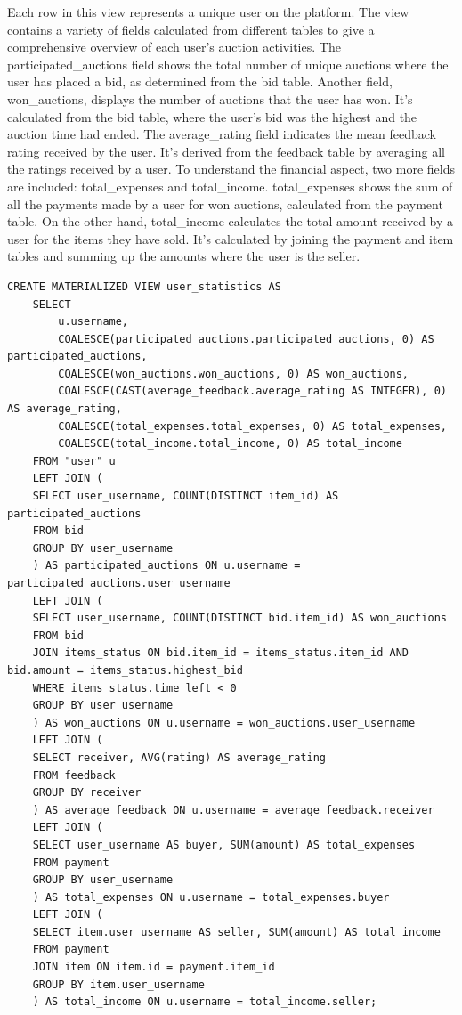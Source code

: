 Each row in this view represents a unique user on the platform. The view contains a variety of fields calculated from different tables to give a comprehensive overview of each user's auction activities. The participated\_auctions field shows the total number of unique auctions where the user has placed a bid, as determined from the bid table. Another field, won\_auctions, displays the number of auctions that the user has won. It's calculated from the bid table, where the user's bid was the highest and the auction time had ended. The average\_rating field indicates the mean feedback rating received by the user. It's derived from the feedback table by averaging all the ratings received by a user.
To understand the financial aspect, two more fields are included: total\_expenses and total\_income. total\_expenses shows the sum of all the payments made by a user for won auctions, calculated from the payment table. On the other hand, total\_income calculates the total amount received by a user for the items they have sold. It's calculated by joining the payment and item tables and summing up the amounts where the user is the seller.

\begin{lstlisting}[style=sqlStyle]
	CREATE MATERIALIZED VIEW user_statistics AS
	SELECT 
		u.username,
		COALESCE(participated_auctions.participated_auctions, 0) AS participated_auctions,
		COALESCE(won_auctions.won_auctions, 0) AS won_auctions,
		COALESCE(CAST(average_feedback.average_rating AS INTEGER), 0) AS average_rating,
		COALESCE(total_expenses.total_expenses, 0) AS total_expenses,
		COALESCE(total_income.total_income, 0) AS total_income
	FROM "user" u
	LEFT JOIN (
	SELECT user_username, COUNT(DISTINCT item_id) AS participated_auctions
	FROM bid
	GROUP BY user_username
	) AS participated_auctions ON u.username = participated_auctions.user_username
	LEFT JOIN (
	SELECT user_username, COUNT(DISTINCT bid.item_id) AS won_auctions
	FROM bid
	JOIN items_status ON bid.item_id = items_status.item_id AND bid.amount = items_status.highest_bid
	WHERE items_status.time_left < 0
	GROUP BY user_username
	) AS won_auctions ON u.username = won_auctions.user_username
	LEFT JOIN (
	SELECT receiver, AVG(rating) AS average_rating
	FROM feedback
	GROUP BY receiver
	) AS average_feedback ON u.username = average_feedback.receiver
	LEFT JOIN (
	SELECT user_username AS buyer, SUM(amount) AS total_expenses
	FROM payment
	GROUP BY user_username
	) AS total_expenses ON u.username = total_expenses.buyer
	LEFT JOIN (
	SELECT item.user_username AS seller, SUM(amount) AS total_income
	FROM payment
	JOIN item ON item.id = payment.item_id
	GROUP BY item.user_username
	) AS total_income ON u.username = total_income.seller;
\end{lstlisting}


